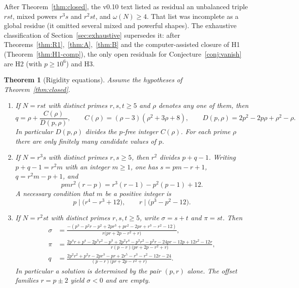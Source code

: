 \documentclass[11pt,reqno]{amsart}
\newtheorem{theorem}{Theorem}
\theoremstyle{definition}
\begin{document}
After Theorem~\ref{thm:closed}, the v0.10 text listed as residual an unbalanced triple \(rst\), mixed powers \(r^3s\) and \(r^2st\), and \(\omega(N)\ge 4\). That list was incomplete as a global residue (it omitted several mixed and powerful shapes). The exhaustive classification of Section~\ref{sec:exhaustive} supersedes it: after Theorems~\ref{thm:R1},~\ref{thm:A},~\ref{thm:B} and the computer-assisted closure of H1 (Theorem~\ref{thm:H1-comp}), the only open residuals for Conjecture~\ref{conj:vanish} are H2 (with \(p\ge 10^6\)) and H3.

\begin{theorem}[Rigidity equations]
\label{thm:rigid}
Assume the hypotheses of Theorem~\ref{thm:closed}.
\begin{enumerate}
\item[\textup{(a)}]
If \(N=rst\) with distinct primes \(r,s,t\ge 5\) and \(\rho\) denotes any one of them, then
\begin{equation}
\label{eq:qCD}
q=\rho+\frac{C(\rho)}{D(p,\rho)},\qquad
C(\rho)=(\rho-3)(\rho^2+3\rho+8),\qquad
D(p,\rho)=2p^2-2p\rho+\rho^2-\rho.
\end{equation}
In particular \(D(p,\rho)\) divides the \(p\)-free integer \(C(\rho)\). For each prime \(\rho\) there are only finitely many candidate values of \(p\).
\item[\textup{(b)}]
If \(N=r^3s\) with distinct primes \(r,s\ge 5\), then \(r^2\) divides \(p+q-1\). Writing \(p+q-1=r^2m\) with an integer \(m\ge 1\), one has \(s=pm-r+1\), \(q=r^2m-p+1\), and
\begin{equation}
\label{eq:r3s}
pmr^2(r-p)=r^3(r-1)-p^2(p-1)+12.
\end{equation}
A necessary condition that \(m\) be a positive integer is
\begin{equation}
\label{eq:dual}
p\mid\bigl(r^4-r^3+12\bigr),\qquad r\mid\bigl(p^3-p^2-12\bigr).
\end{equation}
\item[\textup{(c)}]
If \(N=r^2st\) with distinct primes \(r,s,t\ge 5\), write \(\sigma=s+t\) and \(\pi=st\). Then
\begin{align}
\label{eq:r2st-sig}
\sigma&=\frac{-(p^3-p^2r-p^2+2pr^3+pr^2-2pr+r^3-r^2-12)}{r\bigl(pr+2p-r^2+r\bigr)},\\
\label{eq:r2st-pi}
\pi&=\frac{2p^4r+p^4-2p^3r^2-p^3+2p^2r^4-p^2r^2-p^2r-24pr-12p+12r^2-12r}{r(p-r)\bigl(pr+2p-r^2+r\bigr)},\\
\label{eq:r2st-q}
q&=\frac{2p^2r^2+p^2r-2pr^3-pr+2r^5-r^3-r^2-12r-24}{(p-r)\bigl(pr+2p-r^2+r\bigr)}.
\end{align}
In particular a solution is determined by the pair \((p,r)\) alone. The offset families \(r=p\pm 2\) yield \(\sigma<0\) and are empty.
\end{enumerate}
\end{theorem}
\end{document}
